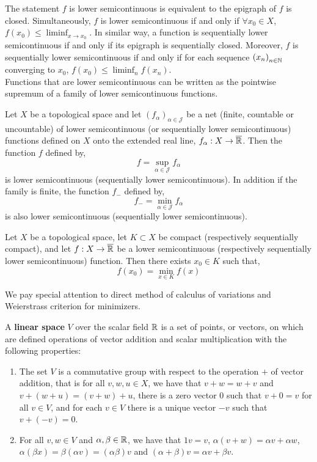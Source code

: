 The statement $f$ is lower semicontinuous is equivalent to the epigraph of $f$ is closed. Simultaneously, $f$ is lower semicontinuous if and only if $\forall x_0 \in X$, $f(x_0)\leq \liminf_{x\rightarrow x_0}$. In similar way, a function is sequentially lower semicontinuous if and only if its epigraph is sequentially closed. Moreover, $f$ is sequentially lower semicontinuous if and only if for each sequence $\left( x_n \right)_{n\in\mathbb{N}}$  converging to $x_0$, $f(x_0)\leq \liminf_n f(x_n)$.\\

Functions that are lower semicontinuous can be written as the pointwise supremum of a family of lower semicontinuous functions. 
\begin{theorem}Let $X$ be a topological space and let $(f_\alpha)_{\alpha\in \mathcal{J}}$ be a net (finite, countable or uncountable) of lower semicontinuous (or sequentially lower semicontinuous) functions defined on $X$ onto the extended real line, $f_\alpha: X\rightarrow \overline{\mathbb{R}}$. Then the function $f$ defined by,
	\begin{equation*}
		f=\sup_{\alpha\in\mathcal{J}}f_\alpha
	\end{equation*}
is lower semicontinuous (sequentially lower semicontinuous).
In addition if the family is finite, the function $f_{-}$ defined by,
\begin{equation*}
	f_{-}= \min_{\alpha\in\mathcal{J}} f_\alpha
\end{equation*}
is also lower semicontinuous (sequentially lower semicontinuous).
\end{theorem}

\begin{theorem}[Weierstrass]
	Let $X$ be a topological space, let $K\subset X$ be compact (respectively sequentially compact), and let $f:X\rightarrow \overline{\mathbb{R}}$ be a lower semicontinuous (respectively sequentially lower semicontinuous) function.
	Then there exists $x_0\in K$ such that,
	\begin{equation*}
		f(x_0)=\min_{x\in K} f(x)
	\end{equation*}
\end{theorem}
We pay special attention to direct method of calculus of variations and Weierstrass criterion for minimizers.


A \textbf{linear space} $V$ over the scalar field $\mathbb{R}$ is a set of points, or vectors, on which are defined operations of vector addition and scalar multiplication with the following properties:
\begin{enumerate}
	\item The set $V$ is a commutative group with respect to the operation $+$ of vector addition, that is for all $v,w,u\in X$, we have that $v+w=w+v$ and $v+(w+u)=(v+w)+u$, there is a zero vector $0$ such that $v+0=v$ for all $v\in V$, and for each $v\in V$ there is a unique vector $-v$ such that $v+(-v)=0$. \\
	\item 	For all $v,w\in V$ and $\alpha, \beta \in \mathbb{R}$, we have that $1v=v$, $\alpha(v+w)=\alpha v+\alpha w$, $\alpha (\beta x)=\beta(\alpha v)=(\alpha\beta) v$ and $(\alpha+\beta)v=\alpha v+\beta v$.
\end{enumerate}

